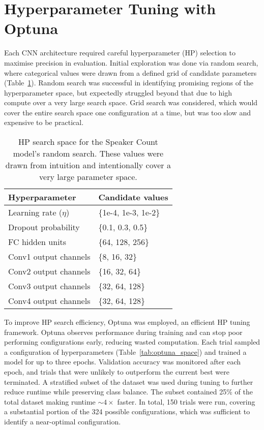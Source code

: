 \section{Hyperparameter Tuning with Optuna} 
\label{sec:Optuna}
Each CNN architecture required careful hyperparameter (HP) selection to maximise precision in evaluation. Initial exploration was done via random search, where categorical values were drawn from a defined grid of candidate parameters (Table~\ref{tab:hparam_space}). Random search was successful in identifying promising regions of the hyperparameter space, but expectedly struggled beyond that due to high compute over a very large search space. Grid search was considered, which would cover the entire search space one configuration at a time, but was too slow and expensive to be practical.


\begin{table}[H]
\centering
\caption{HP search space for the Speaker Count model's random search. These values were drawn from intuition and intentionally cover a very large parameter space.}
\begin{tabular}{ll}
\hline
Hyperparameter & Candidate values \\
\hline
Learning rate ($\eta$) & \{1e-4, 1e-3, 1e-2\} \\
Dropout probability & \{0.1, 0.3, 0.5\} \\
FC hidden units & \{64, 128, 256\} \\
Conv1 output channels & \{8, 16, 32\} \\
Conv2 output channels & \{16, 32, 64\} \\
Conv3 output channels & \{32, 64, 128\} \\
Conv4 output channels & \{32, 64, 128\} \\
\hline
\end{tabular}
\label{tab:hparam_space}
\end{table}

To improve HP search efficiency, Optuna \cite{optuna_2019} was employed, an efficient HP tuning framework. Optuna observes performance during training and can stop poor performing configurations early, reducing wasted computation. Each trial sampled a configuration of hyperparameters (Table~\ref{tab:optuna_space}) and trained a model for up to three epochs. Validation accuracy was monitored after each epoch, and trials that were unlikely to outperform the current best were terminated. A stratified subset of the dataset was used during tuning to further reduce runtime while preserving class balance. The subset contained 25\% of the total dataset making runtime $\sim4\times$ faster. In total, 150 trials were run, covering a substantial portion of the 324 possible configurations, which was sufficient to identify a near-optimal configuration.  \newline

